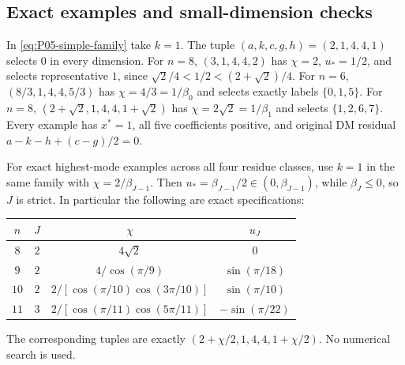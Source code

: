 \documentclass[11pt]{article}
\theoremstyle{definition}
\theoremstyle{remark}
\begin{document}
\subsection{Exact examples and small-dimension checks}

In \eqref{eq:P05-simple-family} take $k=1$. The tuple
$(a,k,c,g,h)=(2,1,4,4,1)$ selects $0$ in every dimension.
For $n=8$, $(3,1,4,4,2)$ has $\chi=2$, $u_*=1/2$, and selects
representative $1$, since
$\sqrt2/4<1/2<(2+\sqrt2)/4$.
For $n=6$, $(8/3,1,4,4,5/3)$ has $\chi=4/3=1/\beta_0$ and
selects exactly labels $\{0,1,5\}$.
For $n=8$, $(2+\sqrt2,1,4,4,1+\sqrt2)$ has
$\chi=2\sqrt2=1/\beta_1$ and selects $\{1,2,6,7\}$.
Every example has $x^*=1$, all five coefficients positive, and original
DM residual $a-k-h+(c-g)/2=0$.

For exact highest-mode examples across all four residue classes, use
$k=1$ in the same family with $\chi=2/\beta_{J-1}$. Then
$u_*=\beta_{J-1}/2\in(0,\beta_{J-1})$, while $\beta_J\le0$,
so $J$ is strict. In particular the following are exact specifications:
\begin{center}
\begin{tabular}{@{}c c c c@{}}
\toprule
$n$ & $J$ & $\chi$ & $u_J$\\\midrule
$8$ & $2$ & $4\sqrt2$ & $0$\\
$9$ & $2$ & $4/\cos(\pi/9)$ & $\sin(\pi/18)$\\
$10$ & $2$ & $2/[\cos(\pi/10)\cos(3\pi/10)]$ & $\sin(\pi/10)$\\
$11$ & $3$ & $2/[\cos(\pi/11)\cos(5\pi/11)]$ & $-\sin(\pi/22)$\\
\bottomrule
\end{tabular}
\end{center}
The corresponding tuples are exactly
$(2+\chi/2,1,4,4,1+\chi/2)$. No numerical search is used.
\end{document}
